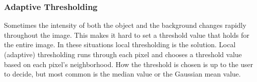 \subsubsection{Adaptive Thresholding}
Sometimes the intensity of both the object and the background changes rapidly throughout the image. This makes it hard to set a threshold value that holds for the entire image. In these situations local thresholding is the solution. Local (adaptive) thresholding runs through each pixel and chooses a threshold value based on each pixel's neighborhood. How the threshold is chosen is up to the user to decide, but most common is the median value or the Gaussian mean value.

